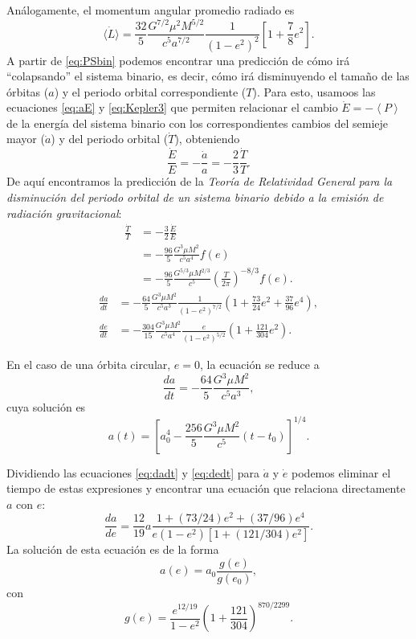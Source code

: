 Análogamente, el momentum angular promedio radiado es
\begin{equation*}
\langle\dot{L}\rangle=\frac{32}{5}\frac{G^{7/2}\mu^{2}M^{5/2}}{c^5a^{7/2}}\frac{1}{(1-e^{2})^{2}}\left[1+\displaystyle\frac{7}{8}e^{2}\right].
\end{equation*}
A partir de \ref{eq:PSbin} podemos encontrar una predicción de cómo irá ``colapsando'' el sistema binario, es decir, 
cómo irá disminuyendo el tamaño de las órbitas ($a$) y el periodo orbital correspondiente ($T$). Para esto, usamoos las ecuaciones
 \ref{eq:aE} y \ref{eq:Kepler3} que permiten relacionar el cambio $\dot{E}=-\left\langle P\right\rangle$ de la energía del sistema binario con los correspondientes cambios del semieje mayor ($\dot{a}$) y del periodo orbital ($\dot{T}$), obteniendo
\begin{equation*}
\frac{\dot{E}}{E}=-\frac{\dot{a}}{a}=-\frac{2}{3}\frac{\dot{T}}{T}.
\end{equation*}
De aquí encontramos la predicción de la \textit{Teoría de Relatividad General para la disminución del periodo orbital de un sistema binario debido a la emisión de radiación gravitacional}:
\begin{align*}
\frac{\dot{T}}{T} &= -\frac{3}{2}\frac{\dot{E}}{E} \\
&= -\frac{96}{5} \frac{G^3\mu M^2}{c^5a^4}f(e) \\
&= -\frac{96}{5} \frac{G^{5/3}\mu M^{2/3}}{c^5}\left(\frac{T}{2\pi}\right)^{-8/3}f(e).
\end{align*}
\begin{align}
\frac{da}{dt} &= -\frac{64}{5}\frac{G^3\mu M^2}{c^5a^3}\frac{1}{\left(1-e^2\right)^{7/2}}\left(1+\frac{73}{24}e^2+\frac{37}{96}e^4\right) \label{eq:dadt},\\
\frac{de}{dt} &= -\frac{304}{15}\frac{G^3\mu M^2}{c^5a^4}\frac{e}{\left(1-e^2\right)^{5/2}}\left(1+\frac{121}{304}e^2\right). \label{eq:dedt}
\end{align}

En el caso de una órbita circular, $e=0$, la ecuación se reduce a
\begin{equation}
\frac{da}{dt} = -\frac{64}{5}\frac{G^3\mu M^2}{c^5a^3},
\end{equation}
cuya solución es
\begin{equation}
a(t) = \left[a_0^4-\frac{256}{5}\frac{G^3\mu M^2}{c^5}(t-t_0)\right]^{1/4}.
\end{equation}

Dividiendo las ecuaciones \ref{eq:dadt} y \ref{eq:dedt} para $\dot{a}$ y $\dot{e}$ podemos eliminar el tiempo de estas expresiones y encontrar una ecuación que relaciona directamente $a$ con $e$:
\begin{equation}
\frac{da}{de}=\frac{12}{19}a\frac{1+(73/24)e^2+(37/96)e^4}{e(1-e^2)[1+(121/304)e^2]}.
\label{eq:dade}
\end{equation}
La solución de esta ecuación es de la forma
\begin{equation*}
a(e)=a_{0}\frac{g(e)}{g(e_{0})},
\end{equation*}
con 
\begin{equation*}
g(e)= \frac{e^{12/19}}{1-e^2}\left(1+\frac{121}{304} \right)^{870/2299}.
\end{equation*}